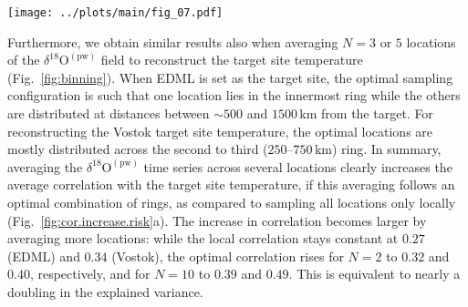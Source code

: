 \documentclass[draft]{agujournal2019}
\begin{document}
\begin{figure*}[t]%
\centering
\texttt{[image: ../plots/main/fig\_07.pdf]}
\caption{%
  The optimal arrangement for averaging three or five
  $\delta^{18}\mathrm{O}^{\mathrm{(pw)}}$ ice cores to reconstruct the target
  site temperature at the EDML (\textbf{a}, \textbf{c}) and Vostok (\textbf{b},
  \textbf{d}) drilling sites. Displayed are subsets of the sampling correlation
  structures for $N=3$ and $5$, showing along the vertical axis the optimal five
  of all possible combinations of rings, i.e., those which exhibit the highest
  mean correlation across $10^5$ random trials of averaging $N=3$ (\textbf{a},
  \textbf{b}) or $N=5$ (\textbf{c}, \textbf{d}) grid cells from these rings. The
  ring bin borders are marked by thin vertical lines with their distances from
  the target site given on the horizontal axis; the selected optimal ring
  combinations are marked as black dots. Systematically, arrangements with
  several ice cores sampled at $500$ to $1000$\,km distances are found to be
  optimal.}
\label{fig:binning}%
\end{figure*}%

Furthermore, we obtain similar results also when averaging $N=3$ or $5$
locations of the $\delta^{18}\mathrm{O}^{\mathrm{(pw)}}$ field to reconstruct
the target site temperature (Fig.~\ref{fig:binning}). When EDML is set as the
target site, the optimal sampling configuration is such that one location lies
in the innermost ring while the others are distributed at distances between
$\sim500$ and $1500$\,km from the target. For reconstructing the Vostok target
site temperature, the optimal locations are mostly distributed across the second
to third ($250$--$750$\,km) ring. In summary, averaging the
$\delta^{18}\mathrm{O}^{\mathrm{(pw)}}$ time series across several locations
clearly increases the average correlation with the target site temperature, if
this averaging follows an optimal combination of rings, as compared to sampling
all locations only locally (Fig.~\ref{fig:cor.increase.risk}a). The increase in
correlation becomes larger by averaging more locations: while the local
correlation stays constant at $0.27$ (EDML) and $0.34$ (Vostok), the optimal
correlation rises for $N=2$ to $0.32$ and $0.40$, respectively, and for $N=10$
to $0.39$ and $0.49$. This is equivalent to nearly a doubling in the explained
variance.
\end{document}
